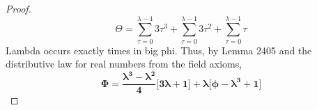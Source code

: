 \documentclass[preview]{standalone}
\begin{document}
\begin{proof}
\begin{equation*}
        \Theta 
            = 
        \sum_{\tau=0}^{\lambda - 1} 3 \tau ^3
            +
        \sum_{\tau=0}^{\lambda - 1} 3 \tau ^2
            +
        \sum_{\tau=0}^{\lambda - 1} \tau
    \end{equation*}
    Lambda occurs exactly  
    times in big phi. 
    Thus, by Lemma 2405
    and the distributive law for real numbers from the field axioms,
    \begin{equation*}
        \bm{
            \Phi
                =
            \frac{
                \lambda ^3 - \lambda ^2
            }
            {4}
            \Bigg[ 3 \lambda + 1 \Bigg]
                + 
            \lambda
            \Bigg[
                \phi - \lambda ^3 + 1
            \Bigg]
        }
    \end{equation*}
\end{proof}
\end{document}
